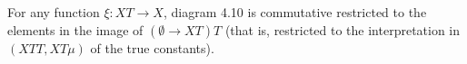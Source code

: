For any function $\xi: XT \longrightarrow X$, diagram 4.10 is commutative restricted to the elements in the image of $(\emptyset \longrightarrow XT)T$ (that is, restricted to the interpretation in $(XTT, XT\mu)$ of the true constants).
